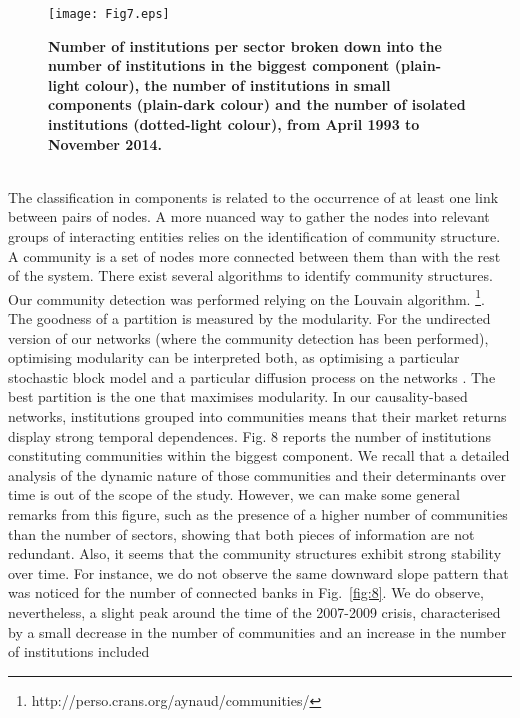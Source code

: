 \documentclass[a4paper,10pt]{article}
\begin{document}
\begin{figure}[!h]
\texttt{[image: Fig7.eps]}
\caption{{\bf Number of institutions per sector broken down into the number of institutions in the biggest component 
(plain-light colour), the number of institutions in small components (plain-dark colour) and the number of isolated 
institutions (dotted-light colour), from April 1993 to November 2014.}}   
\label{fig:7}
\end{figure}
\\
The classification in components is related to the occurrence of at least one link between pairs of nodes. A more nuanced way 
to gather the nodes into relevant groups of interacting entities relies on the identification of community structure. A 
community is a set of nodes more connected between them than with the rest of the system. There exist several algorithms to 
identify community structures. Our community detection was performed relying on the Louvain algorithm. \cite{Blondel2008} 
\footnote{http://perso.crans.org/aynaud/communities/}. 
The goodness of a partition is measured by the modularity. For the undirected version of our networks (where the community 
detection has been performed), optimising modularity can be interpreted both, as optimising a particular stochastic block
model and a particular diffusion process on the networks  \cite{Schaub}. The best partition is the one that maximises 
modularity. In our causality-based networks, institutions grouped into communities means that their market returns display
strong temporal dependences. Fig. 8 reports the number of institutions constituting communities within the biggest component.
We recall that a detailed analysis of the dynamic nature of those communities and their determinants over time is out of the 
scope of the study. However, we can make some general remarks from this figure, such as the presence of a higher number of 
communities than the number of sectors, showing that both pieces of information are not redundant. Also, it seems that the
community structures exhibit strong stability over time. For instance, we do not observe the same downward slope pattern that
was noticed for the number of connected banks in Fig.~\ref{fig:8}. We do observe, nevertheless, a slight peak around 
the time of the 2007-2009 crisis, characterised by a small  decrease in the number of communities and an increase in the number of institutions included 
\end{document}
